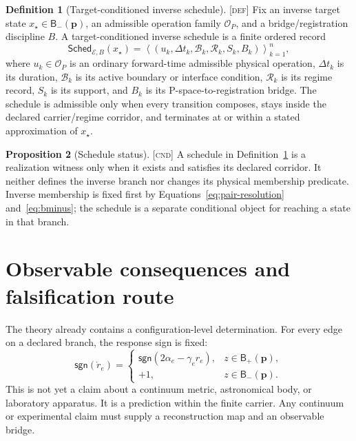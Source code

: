 \documentclass[11pt]{article}
\newcommand{\Branch}{\ensuremath{\mathsf B}}
\newcommand{\Sched}{\ensuremath{\mathsf{Sched}}}
\newcommand{\Defn}{\textsc{[def]}}
\newcommand{\Cnd}{\textsc{[cnd]}}
\theoremstyle{definition}
\newtheorem{definition}{Definition}[section]
\newtheorem{proposition}[definition]{Proposition}
\begin{document}
\begin{definition}[Target-conditioned inverse schedule]
\label{def:schedule}
\Defn{} Fix an inverse target state $x_\star\in\Branch_-(\mathbf p)$, an
admissible operation family $\mathcal O_P$, and a bridge/registration discipline
$B$.  A target-conditioned inverse schedule is a finite ordered record
\begin{equation}
\Sched_{\mathcal E,B}(x_\star)=
\left\langle
(u_k,\Delta t_k,\mathcal B_k,\mathcal R_k,S_k,B_k)
\right\rangle_{k=1}^n,
\label{eq:schedule}
\end{equation}
where $u_k\in\mathcal O_P$ is an ordinary forward-time admissible physical
operation, $\Delta t_k$ is its duration, $\mathcal B_k$ is its active boundary or
interface condition, $\mathcal R_k$ is its regime record, $S_k$ is its support,
and $B_k$ is its P-space-to-registration bridge.  The schedule is admissible only
when every transition composes, stays inside the declared carrier/regime corridor,
and terminates at or within a stated approximation of $x_\star$.
\end{definition}

\begin{proposition}[Schedule status]
\label{prop:schedule}
\Cnd{} A schedule in Definition~\ref{def:schedule} is a realization witness only
when it exists and satisfies its declared corridor.  It neither defines the
inverse branch nor changes its physical membership predicate.  Inverse membership
is fixed first by Equations~\eqref{eq:pair-resolution} and~\eqref{eq:bminus}; the
schedule is a separate conditional object for reaching a state in that branch.
\end{proposition}

\section{Observable consequences and falsification route}
\label{sec:falsification}

The theory already contains a configuration-level determination.  For every edge
on a declared branch, the response sign is fixed:
\begin{equation}
\mathsf{sgn}(\dot r_e)=
\begin{cases}
\mathsf{sgn}(2\alpha_e-\gamma_er_e),&z\in\Branch_+(\mathbf p),\\
+1,&z\in\Branch_-(\mathbf p).
\end{cases}
\label{eq:sign-prediction}
\end{equation}
This is not yet a claim about a continuum metric, astronomical body, or laboratory
apparatus.  It is a prediction within the finite carrier.  Any continuum or
experimental claim must supply a reconstruction map and an observable bridge.
\end{document}
